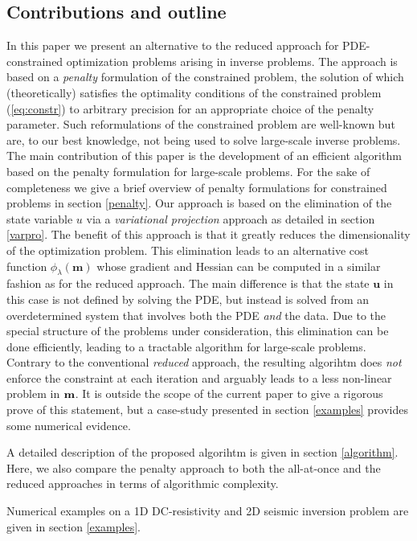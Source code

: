 \documentclass{iopart}
\begin{document}
\subsection{Contributions and outline}
In this paper we present an alternative to the reduced approach 
for PDE-constrained optimization problems arising in inverse problems.
The approach is based on a \emph{penalty} formulation of the constrained problem, 
the solution of which (theoretically) satisfies the optimality conditions of the constrained problem (\ref{eq:constr}) 
to arbitrary precision for an appropriate choice of the penalty parameter.
Such reformulations of the constrained problem are well-known but are, to our best knowledge, 
not being used to solve large-scale inverse problems.
The main contribution of this paper is the development of an efficient algorithm based on the penalty formulation
for large-scale problems. For the sake of completeness we give a brief overview of penalty formulations
for constrained problems in section \ref{penalty}.
Our approach is based on the elimination of the state variable $u$ via
a \emph{variational projection} approach as detailed in section \ref{varpro}. The benefit of this approach is
that it greatly reduces the dimensionality of the optimization problem. This elimination leads to an alternative cost 
function $\phi_{\lambda}(\mathbf{m})$ whose gradient and Hessian can be computed in a similar fashion as for the reduced approach.
The main difference is that the state $\mathbf{u}$ in this case is not defined by solving the PDE, but instead is solved from an overdetermined
system that involves both the PDE \emph{and} the data. Due to the special structure of the problems under consideration, this elimination 
can be done efficiently, leading to a tractable algorithm for large-scale problems. 
Contrary to the conventional \emph{reduced} approach, the resulting algorihtm does \emph{not} enforce the constraint
at each iteration and arguably leads to a less non-linear problem in $\mathbf{m}$. It is outside the scope of the current
paper to give a rigorous prove of this statement, but a case-study presented in section
 \ref{examples} provides some numerical evidence.
 
A detailed description of the proposed algorihtm is given in section \ref{algorithm}.
Here, we also compare the penalty approach to both the all-at-once and the
reduced approaches in terms of algorithmic complexity.

Numerical examples on a 1D DC-resistivity and 2D seismic inversion problem are given in section \ref{examples}.
\end{document}
